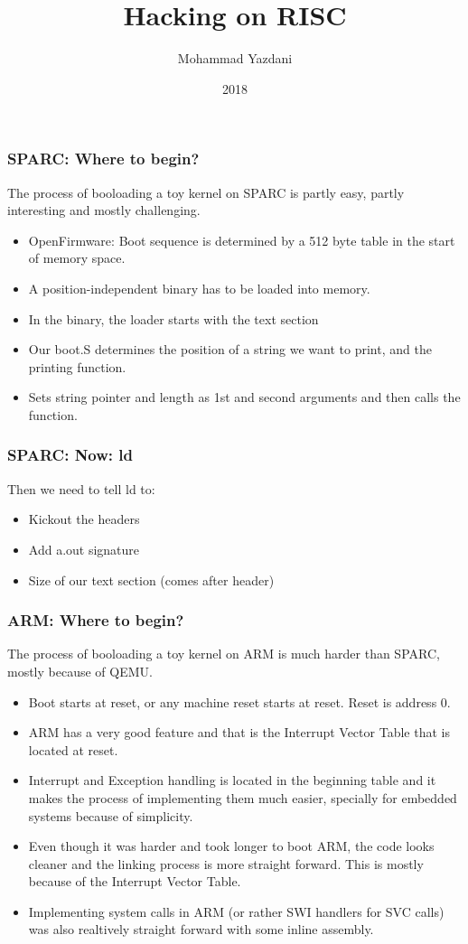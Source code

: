\documentclass{beamer}
\title{Hacking on RISC}
\author{Mohammad Yazdani}
\institute{CS 850}
\date{2018}
\begin{document}
 
\frame{\titlepage}
 
\begin{frame}
\frametitle{SPARC: Where to begin?}
The process of booloading a toy kernel on SPARC is partly easy, partly interesting and mostly challenging.
\begin{itemize}
    \item OpenFirmware: Boot sequence is determined by a 512 byte table in the start of memory space.
    \item A position-independent binary has to be loaded into memory.
    \item In the binary, the loader starts with the text section
    \item Our boot.S determines the position of a string we want to print, and the printing function.
    \item Sets string pointer and length as 1st and second arguments and then calls the function.
\end{itemize}
\end{frame}

\begin{frame}
    \frametitle{SPARC: Now: ld}
    Then we need to tell ld to:
    \begin{itemize}
        \item Kickout the headers
        \item Add a.out signature
        \item Size of our text section (comes after header)
    \end{itemize}
\end{frame}

\begin{frame}
    \frametitle{ARM: Where to begin?}
    The process of booloading a toy kernel on ARM is much harder than SPARC, mostly because of QEMU.
    \begin{itemize}
        \item Boot starts at reset, or any machine reset starts at reset. Reset is address 0.
        \item ARM has a very good feature and that is the Interrupt Vector Table that is located at reset.
        \item Interrupt and Exception handling is located in the beginning table and it makes the process of implementing them much easier, specially for embedded systems because of simplicity.
        \item Even though it was harder and took longer to boot ARM, the code looks cleaner and the linking process is more straight forward. This is mostly because of the Interrupt Vector Table.
        \item Implementing system calls in ARM (or rather SWI handlers for SVC calls) was also realtively straight forward with some inline assembly.
    \end{itemize}
\end{frame}
\end{document}
